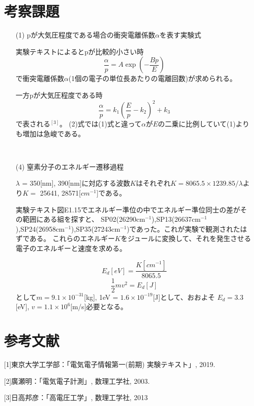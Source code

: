 \documentclass[dvipdfmx]{jsarticle}
\begin{document}
\section{考察課題}

\begin{enumerate}
\item[(1)]
pが大気圧程度である場合の衝突電離係数$\alpha$を表す実験式

実験テキストによるとpが比較的小さい時
\begin{equation}
\frac{\alpha}{p} = A\exp{(-\frac{Bp}{E})}
\end{equation}
で衝突電離係数$\alpha$(1個の電子の単位長あたりの電離回数)が求められる。

一方pが大気圧程度である時
\begin{equation}
\frac{\alpha}{p} = k_{1}(\frac{E}{p}-k_{2})^{2}+k_{3}
\end{equation}
で表される$^{[3]}$。
(2)式では(1)式と違って$\alpha$が$E$の二乗に比例していて(1)よりも増加は急峻である。

\
\item[(4)]窒素分子のエネルギー遷移過程

$\lambda$ = 350[nm], 390[nm]に対応する波数$K$はそれぞれ$K = 8065.5 \times 1239.85/ \lambda$より$K =$ 25641, 28571[$cm^{-1}$]である。

実験テキスト図E1.15でエネルギー準位の中でエネルギー準位同士の差がその範囲にある組を探すと、
SP02(26290cm$^{-1}$),SP13(26637cm$^{-1}$),SP24(26958cm$^{-1}$),SP35(27243cm$^{-1}$)であった。これが実験で観測されたはずである。
これらのエネルギー$K$をジュールに変換して、それを発生させる電子のエネルギーと速度を求める。

\[ E_{d}[eV] = \frac{K[cm^{-1}]}{8065.5}\]
\[ \frac{1}{2}mv^{2} = E_{d}[J]\]
として$m = 9.1\times10^{-31}$[kg], 1eV = $1.6\times10^{-19}$[J]として、おおよそ
$E_{d}= 3.3$[eV], $v = 1.1\times10^{6}$[m/s]必要となる。




\end{enumerate}
\section{参考文献}
[1]東京大学工学部：「電気電子情報第一(前期) 実験テキスト」, 2019.

[2]廣瀬明：「電気電子計測」, 数理工学社, 2003.

[3]日高邦彦：「高電圧工学」, 数理工学社, 2013
\end{document}
